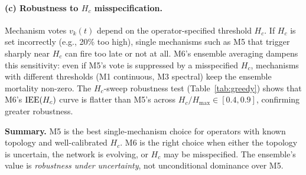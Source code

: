 \paragraph{(c) Robustness to $H_c$ misspecification.}
Mechanism votes $v_k(t)$ depend on the operator-specified threshold $H_c$.
If $H_c$ is set incorrectly (e.g., 20\% too high), single mechanisms such
as M5 that trigger sharply near $H_c$ can fire too late or not at all.
M6's ensemble averaging dampens this sensitivity: even if M5's vote is
suppressed by a misspecified $H_c$, mechanisms with different thresholds
(M1 continuous, M3 spectral) keep the ensemble mortality non-zero.
The $H_c$-sweep robustness test (Table~\ref{tab:greedy}) shows that M6's
$\mathrm{IEE}(H_c)$ curve is flatter than M5's across $H_c/H_{\max} \in [0.4, 0.9]$,
confirming greater robustness.

\medskip
\noindent
\textbf{Summary.}  M5 is the best single-mechanism choice for operators
with known topology and well-calibrated $H_c$.  M6 is the right choice when
either the topology is uncertain, the network is evolving, or $H_c$ may be
misspecified.  The ensemble's value is \emph{robustness under uncertainty},
not unconditional dominance over M5.
